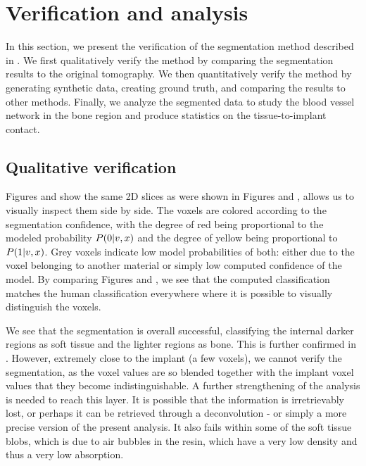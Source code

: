 \section{Verification and analysis}
\label{sec:verification}

In this section, we present the verification of the segmentation method
described in . We first qualitatively verify the method by
comparing the segmentation results to the original tomography. We then
quantitatively verify the method by generating synthetic data, creating ground
truth, and comparing the results to other methods. Finally, we analyze the
segmented data to study the blood vessel network in the bone region and produce
statistics on the tissue-to-implant contact.


\subsection{Qualitative verification}

Figures  and 
show the same 2D slices as were shown in Figures  and
, allows us to visually inspect them side by side. The voxels
are colored according to the segmentation confidence, with the degree of red
being proportional to the modeled probability $P\!\left(0\middle\vert v,x\right)$ and the degree
of yellow being proportional to $P\!\left(1\middle\vert v,x\right)$. Grey voxels indicate low
model probabilities of both: either due to the voxel belonging to another
material or simply low computed confidence of the model. By comparing Figures
 and , we see
that the computed classification matches the human classification everywhere
where it is possible to visually distinguish the voxels.

We see that the segmentation is overall successful, classifying the internal
darker regions as soft tissue and the lighter regions as bone. This is further
confirmed in . However, extremely close to the implant
(a few voxels), we cannot verify the segmentation, as the voxel values are so
blended together with the implant voxel values that they become
indistinguishable. A further strengthening of the analysis is needed to reach
this layer. It is possible that the information is irretrievably lost, or
perhaps it can be retrieved through a deconvolution - or simply a more precise
version of the present analysis. It also fails within some of the soft tissue
blobs, which is due to air bubbles in the resin, which have a very low density
and thus a very low absorption.

